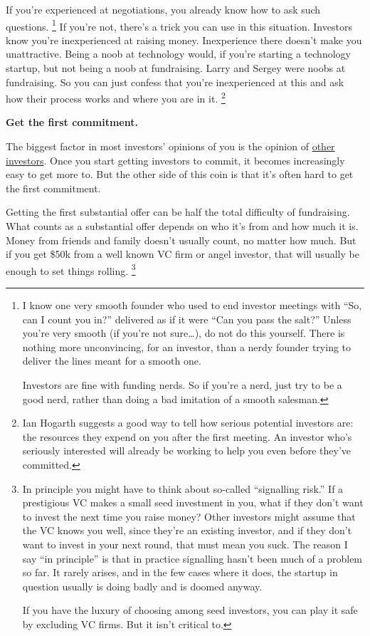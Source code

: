 \documentclass[12pt]{book}
\begin{document}
If you're experienced at negotiations, you already know how to ask such
questions. \footnote{I know one very smooth founder who used to end investor
meetings with ``So, can I count you in?'' delivered as if it were ``Can
you pass the salt?'' Unless you're very smooth (if you're not
sure\ldots), do not do this yourself. There is nothing more
unconvincing, for an investor, than a nerdy founder trying to deliver
the lines meant for a smooth one.

Investors are fine with funding nerds. So if you're a nerd, just try to
be a good nerd, rather than doing a bad imitation of a smooth salesman.} If you're not, there's a trick you
can use in this situation. Investors know you're inexperienced at
raising money. Inexperience there doesn't make you unattractive. Being a
noob at technology would, if you're starting a technology startup, but
not being a noob at fundraising. Larry and Sergey were noobs at
fundraising. So you can just confess that you're inexperienced at this
and ask how their process works and where you are in it.
\footnote{Ian Hogarth suggests a good way to tell how serious potential
investors are: the resources they expend on you after the first meeting.
An investor who's seriously interested will already be working to help
you even before they've committed.}

\textbf{Get the first commitment.}

The biggest factor in most investors' opinions of you is the opinion of
\href{herd.html}{other investors}. Once you start getting investors to
commit, it becomes increasingly easy to get more to. But the other side
of this coin is that it's often hard to get the first commitment.

Getting the first substantial offer can be half the total difficulty of
fundraising. What counts as a substantial offer depends on who it's from
and how much it is. Money from friends and family doesn't usually count,
no matter how much. But if you get \$50k from a well known VC firm or
angel investor, that will usually be enough to set things rolling.
\footnote{In principle you might have to think about so-called
``signalling risk.'' If a prestigious VC makes a small seed investment
in you, what if they don't want to invest the next time you raise money?
Other investors might assume that the VC knows you well, since they're
an existing investor, and if they don't want to invest in your next
round, that must mean you suck. The reason I say ``in principle'' is
that in practice signalling hasn't been much of a problem so far. It
rarely arises, and in the few cases where it does, the startup in
question usually is doing badly and is doomed anyway.

If you have the luxury of choosing among seed investors, you can play it
safe by excluding VC firms. But it isn't critical to.}
\end{document}
